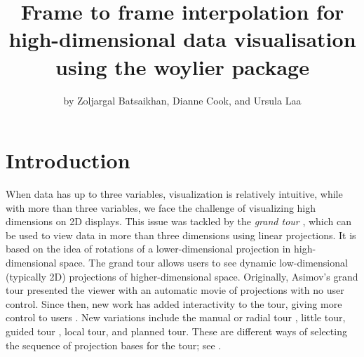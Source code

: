 \title{Frame to frame interpolation for high-dimensional data visualisation using the woylier package}


\author{by Zoljargal Batsaikhan, Dianne Cook, and Ursula Laa}

\maketitle


\section{Introduction}\label{introduction}

When data has up to three variables, visualization is relatively intuitive, while with more than three variables, we face the challenge of visualizing high dimensions on 2D displays. This issue was tackled by the \emph{grand tour} \citep{asimov_1985}, which can be used to view data in more than three dimensions using linear projections. It is based on the idea of rotations of a lower-dimensional projection in high-dimensional space. The grand tour allows users to see dynamic low-dimensional (typically 2D) projections of higher-dimensional space. Originally, Asimov's grand tour presented the viewer with an automatic movie of projections with no user control. Since then, new work has added interactivity to the tour, giving more control to users \citep{buja_cook_asimov_hurley_2005}. New variations include the manual \citep{cook_manual_1997} or radial tour \citep{mmtour}, little tour, guided tour \citep{grandtour1995}, local tour, and planned tour. These are different ways of selecting the sequence of projection bases for the tour; see \citet{tourrev}.

